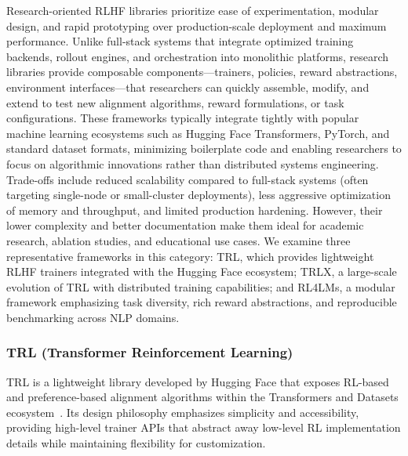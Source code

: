 \documentclass[conference]{IEEEtran}
\begin{document}
Research-oriented RLHF libraries prioritize ease of experimentation, modular design, and rapid prototyping over production-scale deployment and maximum performance. Unlike full-stack systems that integrate optimized training backends, rollout engines, and orchestration into monolithic platforms, research libraries provide composable components—trainers, policies, reward abstractions, environment interfaces—that researchers can quickly assemble, modify, and extend to test new alignment algorithms, reward formulations, or task configurations. These frameworks typically integrate tightly with popular machine learning ecosystems such as Hugging Face Transformers, PyTorch, and standard dataset formats, minimizing boilerplate code and enabling researchers to focus on algorithmic innovations rather than distributed systems engineering. Trade-offs include reduced scalability compared to full-stack systems (often targeting single-node or small-cluster deployments), less aggressive optimization of memory and throughput, and limited production hardening. However, their lower complexity and better documentation make them ideal for academic research, ablation studies, and educational use cases. We examine three representative frameworks in this category: TRL, which provides lightweight RLHF trainers integrated with the Hugging Face ecosystem; TRLX, a large-scale evolution of TRL with distributed training capabilities; and RL4LMs, a modular framework emphasizing task diversity, rich reward abstractions, and reproducible benchmarking across NLP domains.

\subsubsection{TRL (Transformer Reinforcement Learning)}

TRL is a lightweight library developed by Hugging Face that exposes RL-based and preference-based alignment algorithms within the Transformers and Datasets ecosystem~\cite{trl-github, hf-rlhf-blog}. Its design philosophy emphasizes simplicity and accessibility, providing high-level trainer APIs that abstract away low-level RL implementation details while maintaining flexibility for customization.
\end{document}
